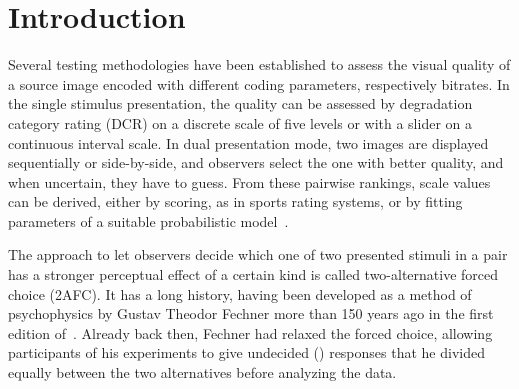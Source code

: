 \documentclass[a4paper,conference]{IEEEtran}
\begin{document}
\section{Introduction}
\label{sec:introduction}

Several testing methodologies have been established to assess the visual quality of a source image encoded with different coding parameters,  respectively bitrates. In the single stimulus presentation, the quality can be assessed by degradation category rating (DCR) on a discrete scale of five levels or with a slider on a continuous interval scale. In dual presentation mode, two images are displayed sequentially or side-by-side, and observers select the one with better quality, and when uncertain, they have to guess. From these pairwise rankings, scale values can be derived, either by scoring, as in sports rating systems, or by fitting parameters of a suitable probabilistic model~\cite{testolina2022,mantiuk2012comparison}.

The approach to let observers decide which one of two presented stimuli in a pair has a stronger perceptual effect of a certain kind is called two-alternative forced choice (2AFC). It has a long history, having been developed as a method of psychophysics by Gustav Theodor Fechner more than 150 years ago in the first edition of~\cite{fechner1889elemente}. Already back then, Fechner had relaxed the forced choice, allowing participants of his experiments to give undecided () responses that  he divided equally between the two alternatives before analyzing the data.
\end{document}
